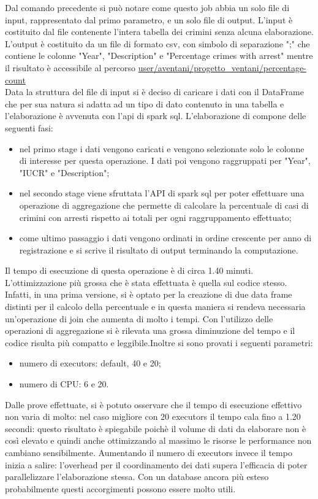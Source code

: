 \documentclass[10pt]{article}
\begin{document}
Dal comando precedente si può notare come questo job abbia un solo file di input, rappresentato dal primo parametro, e un solo file di output. L'input è costituito dal file contenente l'intera tabella dei crimini senza alcuna elaborazione. L'output è costituito da un file di formato csv, con simbolo di separazione ";" che contiene le colonne "Year", "Description" e "Percentage crimes with arrest" mentre il risultato è accessibile al percorso \url{user/aventani/progetto_ventani/percentage-count}\\

Data la struttura del file di input si è deciso di caricare i dati con il DataFrame che per sua natura si adatta ad un tipo di dato contenuto in una tabella e l'elaborazione è avvenuta con l'api di spark sql.
L'elaborazione di compone delle seguenti fasi:
\begin{itemize}
\item nel primo stage i dati vengono caricati e vengono selezionate solo le colonne di interesse per questa operazione. I dati poi vengono raggruppati per "Year", "IUCR" e "Description";
\item nel secondo stage viene sfruttata l'API di spark sql per poter effettuare una operazione di aggregazione che permette di calcolare la percentuale di casi di crimini con arresti rispetto ai totali per ogni raggruppamento effettuato;
\item come ultimo passaggio i dati vengono ordinati in ordine crescente per anno di registrazione e si scrive il risultato di output terminando la computazione.
\end{itemize}

Il tempo di esecuzione di questa operazione è di circa 1.40 minuti.
L'ottimizzazione più grossa che è stata effettuata è quella sul codice stesso. Infatti, in una prima versione, si è optato per la creazione di due data frame distinti per il calcolo della percentuale e in questa maniera si rendeva necessaria un'operazione di join che aumenta di molto i tempi. Con l'utilizzo delle operazioni di aggregazione si è rilevata una grossa diminuzione del tempo e il codice risulta più compatto e leggibile.Inoltre si sono provati i seguenti parametri:
\begin{itemize}
\item numero di executors: default, 40 e 20;
\item numero di CPU: 6 e 20.
\end{itemize}
Dalle prove effettuate, si è potuto osservare che il tempo di esecuzione effettivo non varia di molto: nel caso migliore con 20 executors il tempo cala fino a 1.20 secondi: questo risultato è spiegabile poichè il volume di dati da elaborare non è così elevato e quindi anche ottimizzando al massimo le risorse le performance non cambiano sensibilmente. Aumentando il numero di executors invece il tempo inizia a salire: l'overhead per il coordinamento dei dati supera l'efficacia di poter parallelizzare l'elaborazione stessa. Con un database ancora più esteso probabilmente questi accorgimenti possono essere molto utili. 
\end{document}
